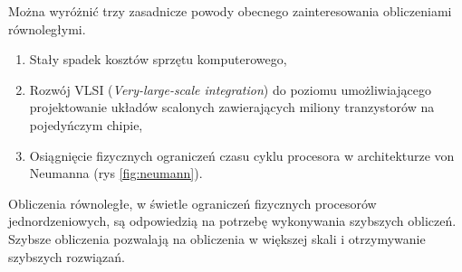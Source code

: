Można wyróżnić trzy zasadnicze powody obecnego zainteresowania obliczeniami równoległymi.
\begin{enumerate}
\item{Stały spadek kosztów sprzętu komputerowego,}
\item{Rozwój VLSI (\emph{Very-large-scale integration}) do poziomu umożliwiającego projektowanie układów scalonych zawierających miliony tranzystorów na pojedyńczym chipie,}
\item{Osiągnięcie fizycznych ograniczeń czasu cyklu procesora w architekturze von Neumanna (rys \ref{fig:neumann}).}
\end{enumerate}

Obliczenia równoległe, w świetle ograniczeń fizycznych procesorów jednordzeniowych, są odpowiedzią na potrzebę wykonywania szybszych obliczeń. Szybsze obliczenia pozwalają na obliczenia w większej skali i otrzymywanie szybszych rozwiązań.
